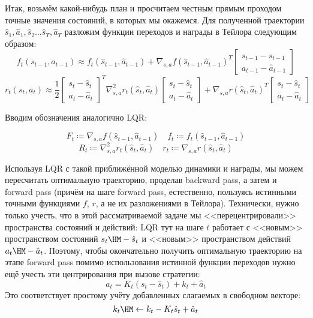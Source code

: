 Итак, возьмём какой-нибудь план и просчитаем честным прямым проходом точные значения состояний, в которых мы окажемся. Для полученной траектории $\hat{s}_1, \hat{a}_1, \hat{s}_2 \dots \hat{s}_T, \hat{a}_T$ разложим функции переходов и награды в Тейлора следующим образом:
$$f_t(s_{t-1}, a_{t-1}) \approx f_t(\hat{s}_{t-1}, \hat{a}_{t-1}) + \nabla_{s, a} f(\hat{s}_{t-1}, \hat{a}_{t-1})^T \begin{bmatrix} s_{t-1} - \hat{s}_{t-1} \\ a_{t-1} - \hat{a}_{t-1} \end{bmatrix}$$
$$r_t(s_t, a_t) \approx \frac{1}{2}\begin{bmatrix} s_t - \hat{s}_t \\ a_t - \hat{a}_t \end{bmatrix}^T \nabla^2_{s, a} r_t(\hat{s}_{t}, \hat{a}_{t})\begin{bmatrix} s_t - \hat{s}_t \\ a_t - \hat{a}_t \end{bmatrix} + \nabla_{s, a} r(\hat{s}_t, \hat{a}_t)^T \begin{bmatrix} s_t - \hat{s}_t \\ a_t - \hat{a}_t \end{bmatrix}$$

Вводим обозначения аналогично LQR:

\begin{equation}\label{TaylorFforLQR}
F_t \coloneqq \nabla_{s, a} f(\hat{s}_{t-1}, \hat{a}_{t-1}) \quad f_t \coloneqq f_t(\hat{s}_{t-1}, \hat{a}_{t-1})
\end{equation}
\begin{equation}\label{TaylorRforLQR}
R_t \coloneqq \nabla^2_{s, a} r_t(\hat{s}_{t}, \hat{a}_{t}) \quad r_t \coloneqq \nabla_{s, a} r(\hat{s}_t, \hat{a}_t)
\end{equation}

Используя LQR с такой приближённой моделью динамики и награды, мы можем пересчитать оптимальную траекторию, проделав backward pass, а затем и forward pass (причём на шаге forward pass, естественно, пользуясь истинными точными функциями $f$, $r$, а не их разложениями в Тейлора). Технически, нужно только учесть, что в этой рассматриваемой задаче мы <<перецентрировали>> пространства состояний и действий: LQR тут на шаге $t$ работает с <<новым>> пространством состояний $s_t \HM- \hat{s}_t$ и <<новым>> пространством действий $a_t \HM- \hat{a}_t$. Поэтому, чтобы окончательно получить оптимальную траекторию на этапе forward pass помимо использования истинной функции переходов нужно ещё учесть эти центрирования при вызове стратегии:
$$a_t = K_t (s_t - \hat{s}_t) + k_t + \hat{a}_t$$
Это соответствует простому учёту добавленных слагаемых в свободном векторе:
\begin{equation}\label{iLQR_correction}
k_t \HM\leftarrow k_t - K_t \hat{s}_t + \hat{a}_t
\end{equation}

